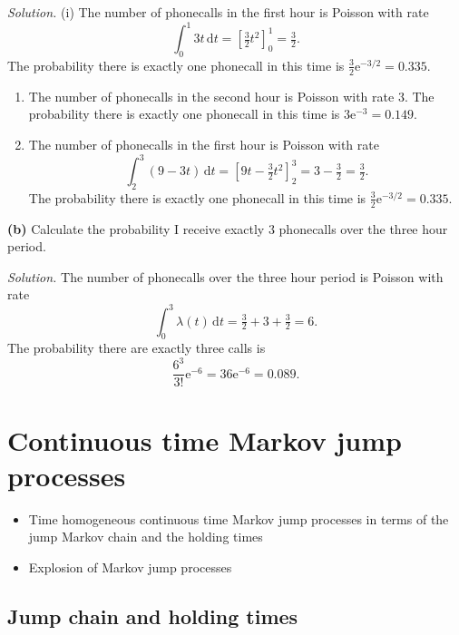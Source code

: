 \documentclass[
  a4paper,
]{article}
\providecommand{\tightlist}{%
  \setlength{\itemsep}{0pt}\setlength{\parskip}{0pt}}
\theoremstyle{definition}
\theoremstyle{definition}
\theoremstyle{definition}
\theoremstyle{remark}
\begin{document}
\begin{myanswers}

\emph{Solution.} (i) The number of phonecalls in the first hour is Poisson with rate
\[ \int_0^1 3t\,\mathrm dt = \left[\tfrac32 t^2 \right]_0^1 = \tfrac32 .  \]
The probability there is exactly one phonecall in this time is \(\frac32 \mathrm{e}^{-3/2} = 0.335\).

\begin{enumerate}
\def\labelenumi{(\roman{enumi})}
\setcounter{enumi}{1}
\item
  The number of phonecalls in the second hour is Poisson with rate \(3\).
  The probability there is exactly one phonecall in this time is \(3 \mathrm{e}^{-3} = 0.149\).
\item
  The number of phonecalls in the first hour is Poisson with rate
  \[ \int_2^3 (9-3t)\,\mathrm dt = \left[9t - \tfrac32 t^2 \right]_2^3 = 3 - \tfrac32 = \tfrac32 .  \]
  The probability there is exactly one phonecall in this time is \(\frac32 \mathrm{e}^{-3/2} = 0.335\).
\end{enumerate}

\end{myanswers}

\textbf{(b)} Calculate the probability I receive exactly \(3\) phonecalls over the three hour period.

\begin{myanswers}
\emph{Solution.}
The number of phonecalls over the three hour period is Poisson with rate
\[ \int_0^3 \lambda(t)\,\mathrm dt = \tfrac32 + 3 + \tfrac32 = 6 . \]
The probability there are exactly three calls is
\[ \frac{6^3}{3!} \mathrm{e}^{-6} = 36 \mathrm{e}^{-6} = 0.089.     \]

\end{myanswers}

\hypertarget{S17-continuous-time}{%
\section{Continuous time Markov jump processes}\label{S17-continuous-time}}

\begin{itemize}
\tightlist
\item
  Time homogeneous continuous time Markov jump processes in terms of the jump Markov chain and the holding times
\item
  Explosion of Markov jump processes
\end{itemize}

\hypertarget{jump-holding}{%
\subsection{Jump chain and holding times}\label{jump-holding}}
\end{document}
